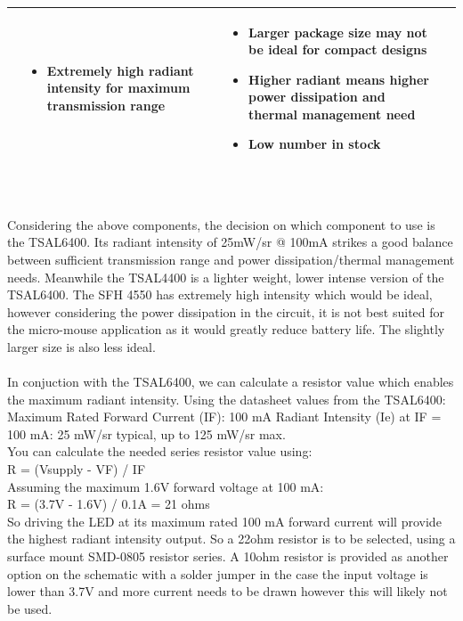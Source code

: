 \documentclass[class=report,11pt,crop=false]{standalone}
\begin{document}
\begin{table}[h]
\begin{center}
\begin{tabular}{|>{\centering\arraybackslash}m{2cm}|m{3.5cm}|m{5cm}|m{6.5cm}|}
\begin{itemize}
      \end{itemize} &
      \begin{itemize}
      \item Extremely high radiant intensity for maximum transmission range  
      \end{itemize} &
      \begin{itemize}
      \item Larger package size may not be ideal for compact designs 
      \item Higher radiant means higher power dissipation and thermal management need 
      \item Low number in stock
      \end{itemize} \\
      \hline
    \end{tabular}
  \end{center}
\end{table} \\\\
Considering the above components, the decision on which component to use is the TSAL6400. Its radiant intensity of 25mW/sr @ 100mA strikes a good balance between sufficient transmission range and power dissipation/thermal management needs. Meanwhile the TSAL4400 is a lighter weight, lower intense version of the TSAL6400. The SFH 4550 has extremely high intensity which would be ideal, however considering the power dissipation in the circuit, it is not best suited for the micro-mouse application as it would greatly reduce battery life. The slightly larger size is also less ideal.
\\\\ %
In conjuction with the TSAL6400, we can calculate a resistor value which enables the maximum radiant intensity. Using the datasheet values from the TSAL6400: Maximum Rated Forward Current (IF): 100 mA
Radiant Intensity (Ie) at IF = 100 mA: 25 mW/sr typical, up to 125 mW/sr max.\\
You can calculate the needed series resistor value using:\\
R = (Vsupply - VF) / IF\\
Assuming the maximum 1.6V forward voltage at 100 mA:\\
R = (3.7V - 1.6V) / 0.1A = 21 ohms
\\
So driving the LED at its maximum rated 100 mA forward current will provide the highest radiant intensity output. So a 22ohm resistor is to be selected, using a surface mount SMD-0805 resistor series. A 10ohm resistor is provided as another option on the schematic with a solder jumper in the case the input voltage is lower than 3.7V and more current needs to be drawn however this will likely not be used.
\end{document}
